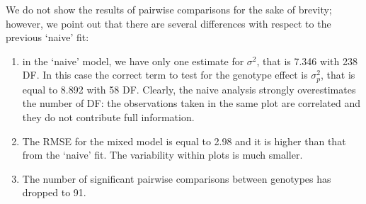 \documentclass[a4paper,12pt,oneside]{book}
\providecommand{\tightlist}{%
  \setlength{\itemsep}{0pt}\setlength{\parskip}{0pt}}
\newenvironment{Shaded}{\begin{snugshade}}{\end{snugshade}}
\newcommand{\DecValTok}[1]{#1}
\newcommand{\FloatTok}[1]{#1}
\newcommand{\SpecialCharTok}[1]{#1}
\newcommand{\StringTok}[1]{#1}
\newcommand{\CommentTok}[1]{#1}
\newcommand{\DocumentationTok}[1]{#1}
\newcommand{\OtherTok}[1]{#1}
\newcommand{\FunctionTok}[1]{#1}
\newcommand{\AttributeTok}[1]{#1}
\newcommand{\NormalTok}[1]{#1}
\begin{document}
\begin{Shaded}
\end{Shaded}

We do not show the results of pairwise comparisons for the sake of brevity; however, we point out that there are several differences with respect to the previous `naive' fit:

\begin{enumerate}
\def\labelenumi{\arabic{enumi}.}
\tightlist
\item
  in the `naive' model, we have only one estimate for \(\sigma^2\), that is 7.346 with 238 DF. In this case the correct term to test for the genotype effect is \(\sigma^2_p\), that is equal to 8.892 with 58 DF. Clearly, the naive analysis strongly overestimates the number of DF: the observations taken in the same plot are correlated and they do not contribute full information.
\item
  The RMSE for the mixed model is equal to 2.98 and it is higher than that from the `naive' fit. The variability within plots is much smaller.
\item
  The number of significant pairwise comparisons between genotypes has dropped to 91.
\end{enumerate}
\end{document}

